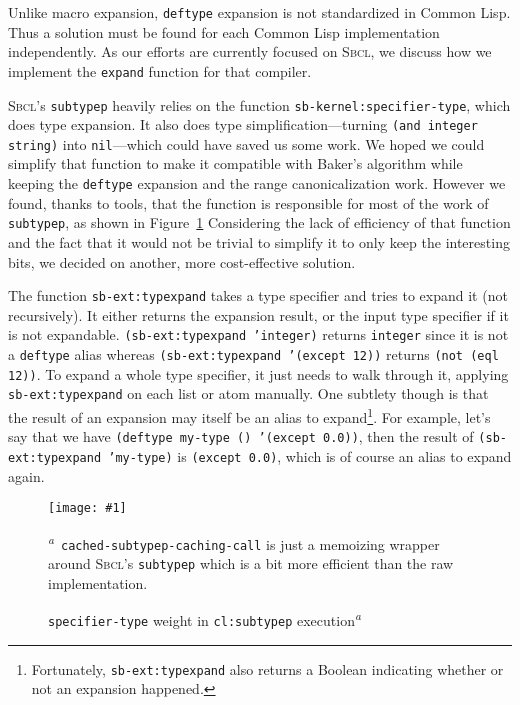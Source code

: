 \documentclass[format=sigconf]{acmart}
\newcommand\code[2][\small]{\sloppy\texttt{#1#2}}
\newcommand\footcode[1]{\code[\scriptsize]{#1}}
\theoremstyle{definition}
\newcommand\sbcl{\textsc{Sbcl}}
\begin{document}
Unlike macro expansion, \code{deftype} expansion is not standardized in Common
Lisp. Thus a solution must be found for each Common Lisp implementation
independently. As our efforts are currently focused on \sbcl{}, we discuss
how we implement the \code{expand} function for that compiler.

\sbcl's \code{subtypep} heavily relies on the function
\code{sb-kernel:specifier-type}, which does type expansion. It also does
type simplification---turning \code{(and integer string)} into
\code{nil}---which could have saved us some work. We hoped we could simplify
that function to make it compatible with Baker's algorithm while keeping the
\code{deftype} expansion and the range canonicalization work. However we found,
thanks to \cite{newton.18.phd} tools, that the function is responsible for most
of the work of \code{subtypep}, as shown in Figure~\ref{fig:specifiertype}
Considering the lack of efficiency of that function and the fact that it would
not be trivial to simplify it to only keep the interesting bits, we decided on
another, more cost-effective solution.

The function \code{sb-ext:typexpand} takes a type specifier and tries to expand
it (not recursively). It either returns the expansion result, or the input type
specifier if it is not expandable. \code{(sb-ext:typexpand 'integer)} returns
\code{integer} since it is not a \code{deftype} alias whereas
\code{(sb-ext:typexpand '(except 12))} returns \code{(not (eql 12))}.
To expand a whole type specifier, it just needs to walk through it, applying
\code{sb-ext:typexpand} on each list or atom manually. One subtlety though is
that the result of an expansion may itself be an alias to
expand\footnote{%
  Fortunately, \footcode{sb-ext:typexpand} also returns a Boolean indicating
  whether or not an expansion happened.%
}. For example, let's say that we have
\code{(deftype my-type () '(except 0.0))}, then the result of
\code{(sb-ext:typexpand 'my-type)} is \code{(except 0.0)}, which is of course an
alias to expand again.

\begin{figure}
  \centering
  \newcommand\profgraph[1]{\texttt{[image: \#1]}}
  \profgraph{assets/19/stGTstp}
  \caption{\code{specifier-type} weight in \code{cl:subtypep}
    execution\textsuperscript{\it a}}
  \footnotesize\textsuperscript{\it a}~\footcode{cached-subtypep-caching-call} is just a memoizing wrapper
  around \sbcl's \footcode{subtypep} which is a bit more efficient than the raw
  implementation.
  \label{fig:specifiertype}
\end{figure}
\end{document}
